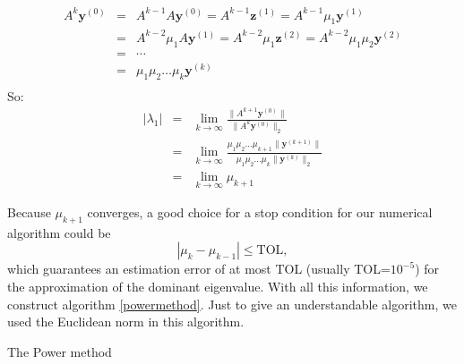 \documentclass[a4paper,11pt]{report}
\begin{document}
\begin{eqnarray*}
  A^k\mathbf{y}^{(0)} &=& A^{k-1}A \mathbf{y}^{(0)} = A^{k-1}\mathbf{z}^{(1)} =  A^{k-1}\mu_1\mathbf{y}^{(1)}\\
  &=&  A^{k-2}\mu_1A\mathbf{y}^{(1)} = A^{k-2}\mu_1\mathbf{z}^{(2)} = 
  A^{k-2}\mu_1\mu_2\mathbf{y}^{(2)}\\
  &=& \cdots \\
  &=& \mu_1 \mu_2 \ldots \mu_k \mathbf{y}^{(k)}\\
\end{eqnarray*}
So:
\begin{eqnarray}
  |\lambda_1| &=& \lim_{k\to \infty} \frac{\|A^{k+1}\mathbf{y}^{(0)}\|}{\|A^k\mathbf{y}^{(0)}\|_2} \label{powertripke}
\\
&=& \lim_{k\to \infty} \frac{\mu_1\mu_2\ldots \mu_{k+1}\|\mathbf{y}^{(k+1)}\|}{\mu_1 \mu_2 \ldots \mu_k\|\mathbf{y}^{(k)}\|_2}\nonumber\\ 
&=& \lim_{k\to \infty} \mu_{k+1}\nonumber
\end{eqnarray}

Because $\mu_{k+1}$ converges, a good choice for a stop condition for our numerical algorithm could be 
$$|\mu_k - \mu_{k-1}| \leq \text{TOL},$$
which guarantees an estimation error of at most TOL (usually TOL=$10^{-5}$) for the approximation of the dominant eigenvalue. With all this information, we construct algorithm \ref{powermethod}. Just to give an understandable algorithm, we 
used the Euclidean norm in this algorithm.


\begin{algorithm}[H]
 \blankline
{}

 
 \caption{The Power method}\label{powermethod}
\end{algorithm}
\end{document}
